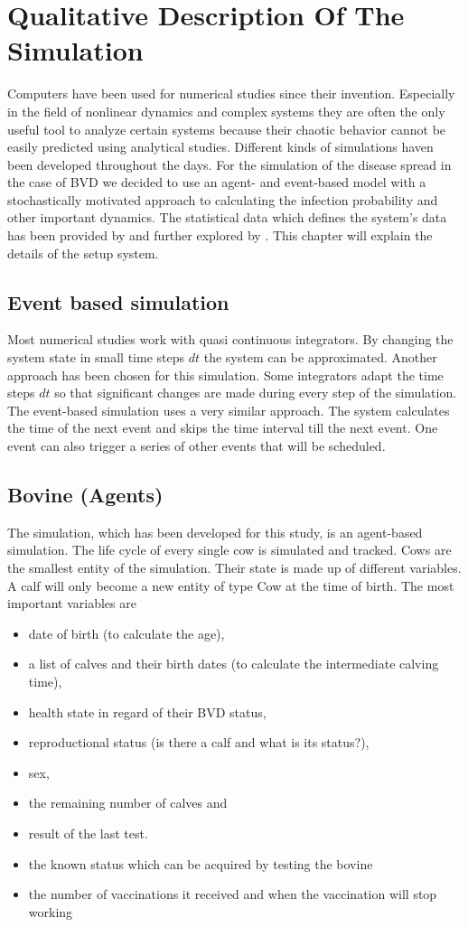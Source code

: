 \chapter{Qualitative Description Of The Simulation}
Computers have been used for numerical studies since their invention. Especially in the field of nonlinear dynamics and complex systems they are often the only useful tool to analyze certain systems because their chaotic behavior cannot be easily predicted using analytical studies. Different kinds of simulations haven been developed throughout the days. For the simulation of the disease spread in the case of BVD we decided to use an agent- and event-based model with a stochastically motivated approach to calculating the infection probability and other important dynamics. The statistical data which defines the system's data has been provided by \citep{personalCom} and further explored by \citep{steinbach16}. This chapter will explain the details of the setup system.
\section{Event based simulation}
Most numerical studies work with quasi continuous integrators. By changing the system state in small time steps $dt$ the system can be approximated. Another approach has been chosen for this simulation. Some integrators adapt the time steps $dt$ so that significant changes are made during every step of the simulation. The event-based simulation uses a very similar approach. The system calculates the time of the next event and skips the time interval till the next event. One event can also trigger a series of other events that will be scheduled. 
\section{Bovine (Agents)}
The simulation, which has been developed for this study, is an agent-based simulation. The life cycle of every single cow is simulated and tracked. Cows are the smallest entity of the simulation. Their state is made up of different variables. A calf will only become a new entity of type Cow at the time of birth. The most important variables are 
\begin{itemize}
\item date of birth (to calculate the age),
\item a list of calves and their birth dates (to calculate the intermediate calving time),
\item health state in regard of their BVD status,
\item reproductional status (is there a calf and what is its status?),
\item sex,
\item the remaining number of calves and
\item result of the last test.
\item the known status which can be acquired by testing the bovine
\item the number of vaccinations it received and when the vaccination will stop working
\end{itemize}

